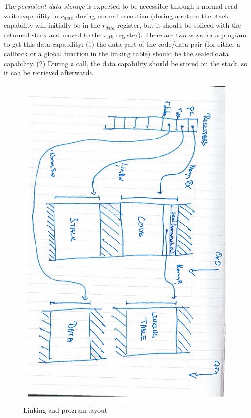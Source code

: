 \documentclass[a3paper]{article}
\newcommand{\var}[1]{\mathit{#1}}
\newcommand{\stk}{\var{stk}}
\newcommand{\data}{\var{data}}
\begin{document}
The \emph{persistent data storage} is expected to be accessible through a normal read-write capability in $r_\data$ during normal execution (during a return the stack capability will initially be in the $r_\data$ register, but it should be spliced with the returned stack and moved to the $r_\stk$ register). There are two ways for a program to get this data capability: (1) the data part of the code/data pair (for either a callback or a global function in the linking table) should be the sealed data capability. (2) During a call, the data capability should be stored on the stack, so it can be retrieved afterwards.
\begin{figure}
  \centering
  \includegraphics[angle=90,width=\textwidth]{img/linking.pdf}
  \caption{Linking and program layout.}
  \label{fig:trg-prog-link}
\end{figure}
\end{document}
